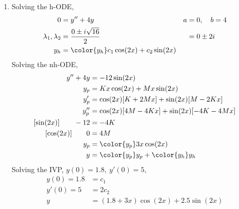 \begin{enumerate}
    \item Solving the h-ODE,
          \begin{align}
              0                        & = y'' + 4y                                  & a & = 0, \quad b = 4 \\
              \lambda_{1}, \lambda_{2} & = \frac{0 \pm i\sqrt{16}}{2}                &   & = 0 \pm 2i       \\
              y_{h}                    & = \color{y_h} c_{1}\cos(2x) + c_{2}\sin(2x)
          \end{align}
          Solving the nh-ODE,
          \begin{align}
              y'' + 4y              & = -12\sin(2x)                               \\
              y_{p}                 & = Kx \cos(2x) + Mx \sin(2x)                 \\
              y_{p}'                & = \cos(2x)[K + 2Mx] + \sin(2x)[M - 2Kx]     \\
              y_{p}''               & = \cos(2x)[4M - 4Kx] + \sin(2x)[-4K - 4Mx]  \\
              [\sin(2x)] \qquad -12 & = -4K                                       \\
              [\cos(2x)] \qquad 0   & = 4M                                        \\
              y_{p}                 & = \color{y_p} 3x \cos(2x)                   \\
              y                     & = {\color{y_p} y_{p}} + {\color{y_h} y_{h}}
          \end{align}
          Solving the IVP, $ y(0) = 1.8,\ y'(0) = 5 $,
          \begin{align}
              y(0) = 1.8 & = c_{1}                            \\
              y'(0) = 5  & = 2c_{2}                           \\
              y          & = (1.8 + 3x)\cos(2x) + 2.5\sin(2x)
          \end{align}


\end{enumerate}
